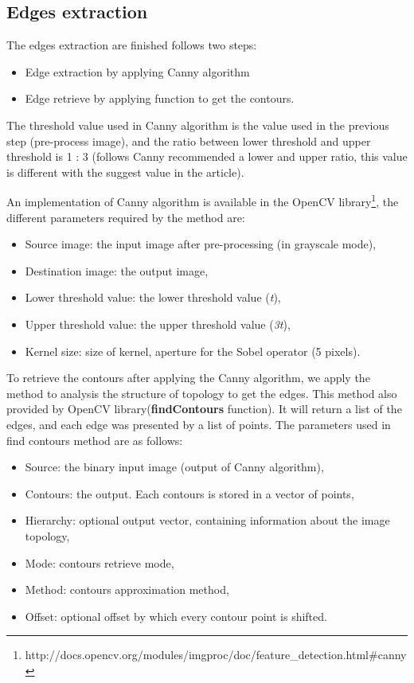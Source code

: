 \subsection{Edges extraction}
The edges extraction are finished follows two steps:
\begin{itemize}
\item Edge extraction by applying Canny algorithm
\item Edge retrieve by applying function to get the contours.
\end{itemize} 
The threshold value used in Canny algorithm is the value used in the previous step (pre-process image), and the ratio between lower threshold and upper threshold is 1 : 3 (follows Canny recommended a lower and upper ratio, this value is different with the suggest value in the article).

 
An implementation of Canny algorithm is available in the OpenCV library\footnote{http://docs.opencv.org/modules/imgproc/doc/feature\_detection.html\#canny}, the different parameters required by the method are:
\begin{itemize}
\item Source image: the input image after pre-processing (in grayscale mode),
\item Destination image: the output image,
\item Lower threshold value: the lower threshold value (\textit{t}),
\item Upper threshold value: the upper threshold value (\textit{3t}),
\item Kernel size: size of kernel, aperture for the Sobel operator (5 pixels).
\end{itemize}
To retrieve the contours after applying the Canny algorithm, we apply the method to analysis the structure of topology to get the edges. This method also provided by OpenCV library(\textbf{findContours} function). It will return a list of the edges, and each edge was presented by a list of points. 
The parameters used in find contours method are as follows:
\begin{itemize}
\item Source: the binary input image (output of Canny algorithm),
\item Contours: the output. Each contours is stored in a vector of points,
\item Hierarchy: optional output vector, containing information about the image topology,
\item Mode: contours retrieve mode,
\item Method: contours approximation method,
\item Offset: optional offset by which every contour point is shifted.
\end{itemize}
